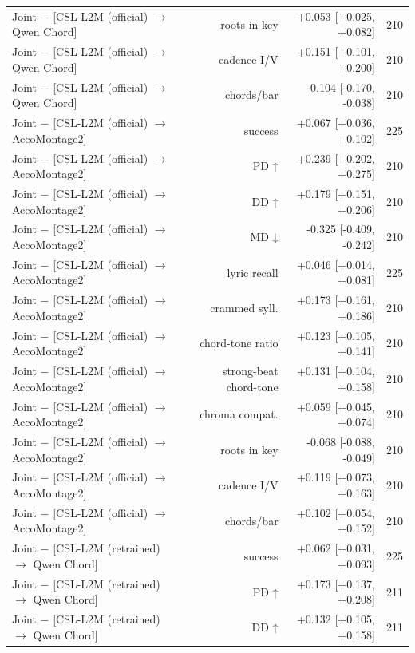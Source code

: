 \begin{table}[t]
\begin{tabular}{lrrr}
Joint $-$ [CSL-L2M (official) $\rightarrow$ Qwen Chord] & roots in key & +0.053 [+0.025, +0.082] & 210 \\
Joint $-$ [CSL-L2M (official) $\rightarrow$ Qwen Chord] & cadence I/V & +0.151 [+0.101, +0.200] & 210 \\
Joint $-$ [CSL-L2M (official) $\rightarrow$ Qwen Chord] & chords/bar & -0.104 [-0.170, -0.038] & 210 \\
Joint $-$ [CSL-L2M (official) $\rightarrow$ AccoMontage2] & success & +0.067 [+0.036, +0.102] & 225 \\
Joint $-$ [CSL-L2M (official) $\rightarrow$ AccoMontage2] & PD ↑ & +0.239 [+0.202, +0.275] & 210 \\
Joint $-$ [CSL-L2M (official) $\rightarrow$ AccoMontage2] & DD ↑ & +0.179 [+0.151, +0.206] & 210 \\
Joint $-$ [CSL-L2M (official) $\rightarrow$ AccoMontage2] & MD ↓ & -0.325 [-0.409, -0.242] & 210 \\
Joint $-$ [CSL-L2M (official) $\rightarrow$ AccoMontage2] & lyric recall & +0.046 [+0.014, +0.081] & 225 \\
Joint $-$ [CSL-L2M (official) $\rightarrow$ AccoMontage2] & crammed syll. & +0.173 [+0.161, +0.186] & 210 \\
Joint $-$ [CSL-L2M (official) $\rightarrow$ AccoMontage2] & chord-tone ratio & +0.123 [+0.105, +0.141] & 210 \\
Joint $-$ [CSL-L2M (official) $\rightarrow$ AccoMontage2] & strong-beat chord-tone & +0.131 [+0.104, +0.158] & 210 \\
Joint $-$ [CSL-L2M (official) $\rightarrow$ AccoMontage2] & chroma compat. & +0.059 [+0.045, +0.074] & 210 \\
Joint $-$ [CSL-L2M (official) $\rightarrow$ AccoMontage2] & roots in key & -0.068 [-0.088, -0.049] & 210 \\
Joint $-$ [CSL-L2M (official) $\rightarrow$ AccoMontage2] & cadence I/V & +0.119 [+0.073, +0.163] & 210 \\
Joint $-$ [CSL-L2M (official) $\rightarrow$ AccoMontage2] & chords/bar & +0.102 [+0.054, +0.152] & 210 \\
Joint $-$ [CSL-L2M (retrained) $\rightarrow$ Qwen Chord] & success & +0.062 [+0.031, +0.093] & 225 \\
Joint $-$ [CSL-L2M (retrained) $\rightarrow$ Qwen Chord] & PD ↑ & +0.173 [+0.137, +0.208] & 211 \\
Joint $-$ [CSL-L2M (retrained) $\rightarrow$ Qwen Chord] & DD ↑ & +0.132 [+0.105, +0.158] & 211 \\

\end{tabular}
\end{table}
